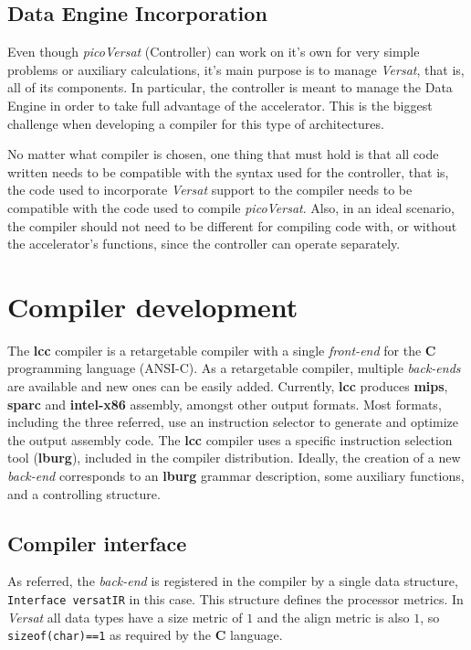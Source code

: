 \documentclass[journal]{IEEEtran}
\begin{document}
\subsection{Data Engine Incorporation}

Even though {\it picoVersat} (Controller) can work on it's own for very simple
problems or auxiliary calculations, it's main purpose is to manage {\it Versat},
that is, all of its components.  In particular, the controller is meant to
manage the Data Engine in order to take full advantage of the accelerator.  This
is the biggest challenge when developing a compiler for this type of
architectures.

No matter what compiler is chosen, one thing that must hold is that all code
written needs to be compatible with the syntax used for the controller, that is,
the code used to incorporate {\it Versat} support to the compiler needs to be
compatible with the code used to compile {\it picoVersat}.  Also, in an ideal
scenario, the compiler should not need to be different for compiling code with,
or without the accelerator's functions, since the controller can operate
separately.

\section{Compiler development}
\label{chapter:develop}

The {\bf lcc} compiler is a retargetable
compiler with a single {\it front-end} for the {\bf C} programming
language ({\sc ANSI-C}).
As a retargetable compiler, multiple {\it back-ends} are available
and new ones can be easily added.
Currently, {\bf lcc} produces {\bf mips}, {\bf sparc} and
{\bf intel-x86} assembly, amongst other output formats.
Most formats, including the three referred, use an instruction
selector to generate and optimize the output assembly code.
The {\bf lcc} compiler uses a specific instruction selection
tool ({\bf lburg}), included in the compiler distribution.
Ideally, the creation of a new {\it back-end} corresponds to an
{\bf lburg} grammar description, some auxiliary functions,
and a controlling structure.

\subsection{Compiler interface}
As referred, the {\it back-end} is registered in the
compiler by a single data structure,
{\tt Interface versatIR} in this case.
This structure defines the processor metrics.
In {\it Versat} all data types have a size
metric of $1$ and the align metric is also $1$,
so {\tt sizeof(char)==1} as required by the {\bf C} language.
\end{document}
